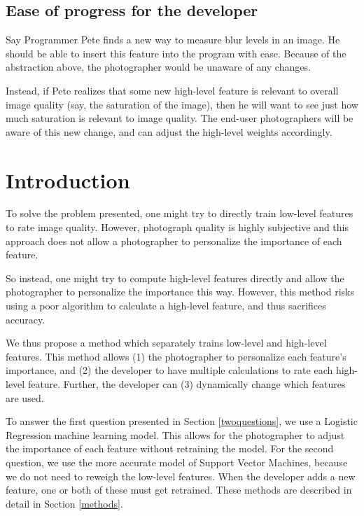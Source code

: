 \documentclass[10pt,twocolumn]{article}
\begin{document}
\subsection{Ease of progress for the developer}
\label{easeofprogramming}
Say Programmer Pete finds a new way to measure blur levels in an image. He should be able to insert this feature into the program with ease. Because of the abstraction above, the photographer would be unaware of any changes.

Instead, if Pete realizes that some new high-level feature is relevant to overall image quality (say, the saturation of the image), then he will want to see just how much saturation is relevant to image quality. The end-user photographers will be aware of this new change, and can adjust the high-level weights accordingly.

\section{Introduction}
To solve the problem presented, one might try to directly train low-level features to rate image quality. However, photograph quality is highly subjective and this approach does not allow a photographer to personalize the importance of each feature.

So instead, one might try to compute high-level features directly and allow the photographer to personalize the importance this way. However, this method risks using a poor algorithm to calculate a high-level feature, and thus sacrifices accuracy.

We thus propose a method which separately trains low-level and high-level features. This method allows (1) the photographer to personalize each feature's importance, and (2) the developer to have multiple calculations to rate each high-level feature. Further, the developer can (3) dynamically change which features are used.


To answer the first question presented in Section \ref{twoquestions}, we use a Logistic Regression machine learning model. This allows for the photographer to adjust the importance of each feature without retraining the model. For the second question, we use the more accurate model of Support Vector Machines, because we do not need to reweigh the low-level features. When the developer adds a new feature, one or both of these must get retrained. These methods are described in detail in Section \ref{methods}.
\end{document}
